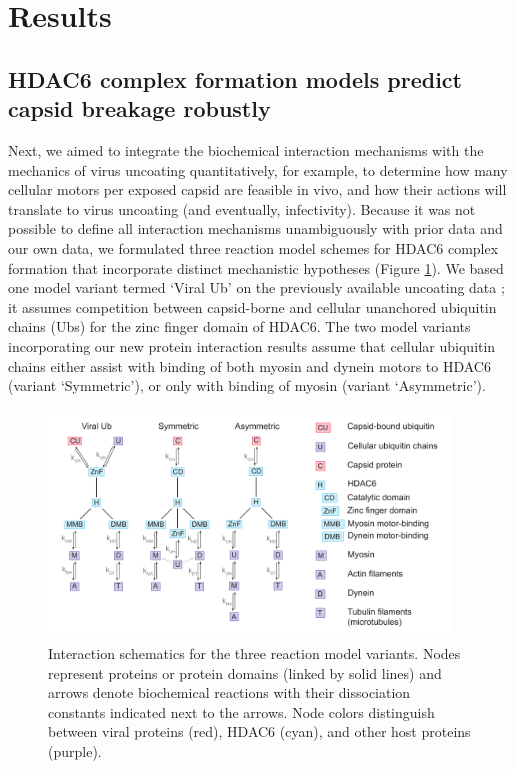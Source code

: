 \section{Results}

\subsection{HDAC6 complex formation models predict capsid breakage robustly}

Next, we aimed to integrate the biochemical interaction mechanisms with the mechanics of virus uncoating quantitatively, for example, to determine how many cellular motors per exposed capsid are feasible in vivo, and how their actions will translate to virus uncoating (and eventually, infectivity). Because it was not possible to define all interaction mechanisms unambiguously with prior data and our own data, we formulated three reaction model schemes for HDAC6 complex formation that incorporate distinct mechanistic hypotheses (Figure \ref{figure:ReactionModelSchemes}). We based one model variant termed ‘Viral Ub’ on the previously available uncoating data \cite{banerjee2014influenza}; it assumes competition between capsid-borne and cellular unanchored ubiquitin chains (Ubs) for the zinc finger domain of HDAC6. The two model variants incorporating our new protein interaction results assume that cellular ubiquitin chains either assist with binding of both myosin and dynein motors to HDAC6 (variant ‘Symmetric’), or only with binding of myosin (variant ‘Asymmetric’).

\begin{figure}
\begin{center}
\includegraphics[width=0.95\textwidth, trim={0cm 0cm 0cm 0cm}, clip]{D_chapters/2_ReactionModel/ReactionModels.pdf}
\caption[Interaction schematics for the three reaction model variants]%
{Interaction schematics for the three reaction model variants. Nodes represent proteins or protein domains (linked by solid lines) and arrows denote biochemical reactions with their dissociation constants indicated next to the arrows. Node colors distinguish between viral proteins (red), HDAC6 (cyan), and other host proteins (purple).}
\label{figure:ReactionModelSchemes}
\end{center}
\end{figure}

